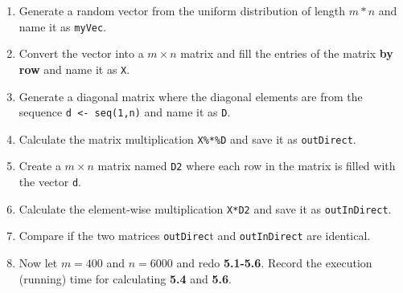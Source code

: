 \documentclass[a4paper]{article}
\begin{document}
\begin{enumerate}
  
  \item Generate a random vector from the uniform distribution of length
    $m*n$ and name it as \texttt{myVec}.

  \item Convert the vector into a $m \times n$ matrix and fill the entries of
    the matrix \textbf{by row} and name it as \texttt{X}.

  \item Generate a diagonal matrix where the diagonal elements are from the
    sequence \texttt{d <- seq(1,n)} and name it as \texttt{D}.

  \item Calculate the matrix multiplication \texttt{X\%*\%D} and save it as
    \texttt{outDirect}.

  \item Create a $m\times n$ matrix named \texttt{D2} where each row in the
    matrix is filled with the vector \texttt{d}.

  \item Calculate the element-wise multiplication \texttt{X*D2} and
    save it as \texttt{outInDirect}.

  \item Compare if the two matrices \texttt{outDirec}t and \texttt{outInDirect}
    are identical.

   \item Now let $m=400$ and $n=6000$ and redo \textbf{5.1-5.6}. Record the execution
  (running) time for calculating \textbf{5.4} and \textbf{5.6}.

\end{enumerate}




 
\end{document}
